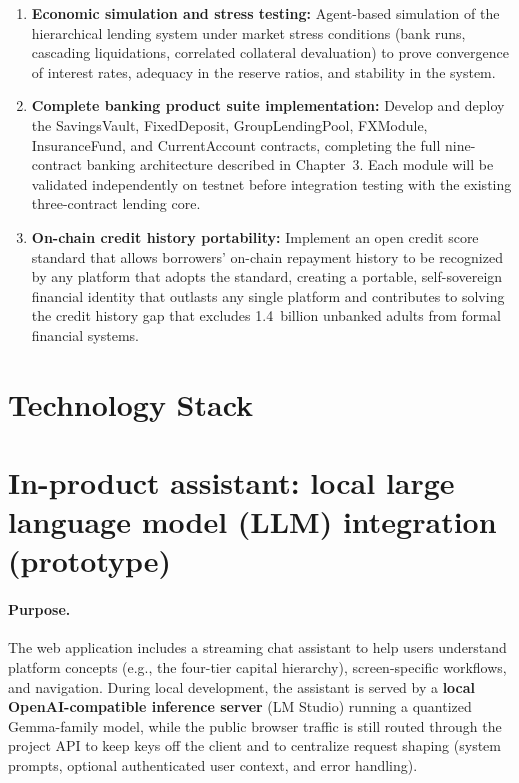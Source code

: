\documentclass[acmsmall,screen,review]{acmart}
\begin{document}
\begin{enumerate}[noitemsep]
\item \textbf{Economic simulation and stress testing:} Agent-based simulation of the hierarchical lending system under market stress conditions (bank runs, cascading liquidations, correlated collateral devaluation) to prove convergence of interest rates, adequacy in the reserve ratios, and stability in the system.
\item \textbf{Complete banking product suite implementation:} Develop and deploy the SavingsVault, FixedDeposit, GroupLendingPool, FXModule, InsuranceFund, and CurrentAccount contracts, completing the full nine-contract banking architecture described in Chapter~3. Each module will be validated independently on testnet before integration testing with the existing three-contract lending core.
\item \textbf{On-chain credit history portability:} Implement an open credit score standard that allows borrowers' on-chain repayment history to be recognized by any platform that adopts the standard, creating a portable, self-sovereign financial identity that outlasts any single platform and contributes to solving the credit history gap that excludes 1.4~billion unbanked adults from formal financial systems.
\end{enumerate}


\appendix

\section{Technology Stack}

\section{In-product assistant: local large language model (LLM) integration (prototype)}

\paragraph{Purpose.}
The web application includes a streaming chat assistant to help users understand platform concepts (e.g., the four-tier capital hierarchy), screen-specific workflows, and navigation. During local development, the assistant is served by a \textbf{local OpenAI-compatible inference server} (LM Studio) running a quantized Gemma-family model, while the public browser traffic is still routed through the project API to keep keys off the client and to centralize request shaping (system prompts, optional authenticated user context, and error handling).
\end{document}
